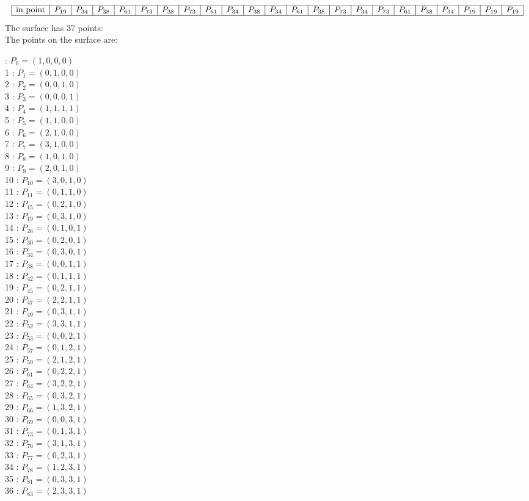 \documentclass{article}
\begin{document}
{$$\begin{array}{|r*{22}{|c}|}
\hline
\mbox{in point}  & P_{19} & P_{34} & P_{38} & P_{61} & P_{73} & P_{38} & P_{73} & P_{61} & P_{34} & P_{38} & P_{34} & P_{61} & P_{38} & P_{73} & P_{34} & P_{73} & P_{61} & P_{38} & P_{34} & P_{19} & P_{19} & P_{19}\\
\hline
\end{array}
$$
The surface has 37 points:\\
The points on the surface are:\\
\begin{multicols}{3}
 : $P_{0}=( 1, 0, 0, 0 )$\\
1 : $P_{1}=( 0, 1, 0, 0 )$\\
2 : $P_{2}=( 0, 0, 1, 0 )$\\
3 : $P_{3}=( 0, 0, 0, 1 )$\\
4 : $P_{4}=( 1, 1, 1, 1 )$\\
5 : $P_{5}=( 1, 1, 0, 0 )$\\
6 : $P_{6}=( 2, 1, 0, 0 )$\\
7 : $P_{7}=( 3, 1, 0, 0 )$\\
8 : $P_{8}=( 1, 0, 1, 0 )$\\
9 : $P_{9}=( 2, 0, 1, 0 )$\\
10 : $P_{10}=( 3, 0, 1, 0 )$\\
11 : $P_{11}=( 0, 1, 1, 0 )$\\
12 : $P_{15}=( 0, 2, 1, 0 )$\\
13 : $P_{19}=( 0, 3, 1, 0 )$\\
14 : $P_{26}=( 0, 1, 0, 1 )$\\
15 : $P_{30}=( 0, 2, 0, 1 )$\\
16 : $P_{34}=( 0, 3, 0, 1 )$\\
17 : $P_{38}=( 0, 0, 1, 1 )$\\
18 : $P_{42}=( 0, 1, 1, 1 )$\\
19 : $P_{45}=( 0, 2, 1, 1 )$\\
20 : $P_{47}=( 2, 2, 1, 1 )$\\
21 : $P_{49}=( 0, 3, 1, 1 )$\\
22 : $P_{52}=( 3, 3, 1, 1 )$\\
23 : $P_{53}=( 0, 0, 2, 1 )$\\
24 : $P_{57}=( 0, 1, 2, 1 )$\\
25 : $P_{59}=( 2, 1, 2, 1 )$\\
26 : $P_{61}=( 0, 2, 2, 1 )$\\
27 : $P_{64}=( 3, 2, 2, 1 )$\\
28 : $P_{65}=( 0, 3, 2, 1 )$\\
29 : $P_{66}=( 1, 3, 2, 1 )$\\
30 : $P_{69}=( 0, 0, 3, 1 )$\\
31 : $P_{73}=( 0, 1, 3, 1 )$\\
32 : $P_{76}=( 3, 1, 3, 1 )$\\
33 : $P_{77}=( 0, 2, 3, 1 )$\\
34 : $P_{78}=( 1, 2, 3, 1 )$\\
35 : $P_{81}=( 0, 3, 3, 1 )$\\
36 : $P_{83}=( 2, 3, 3, 1 )$\\
\end{multicols}


}
\end{document}
